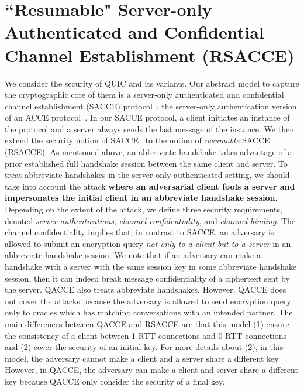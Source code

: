 \section{``Resumable" Server-only Authenticated and Confidential Channel Establishment (RSACCE)} \label{sec:rsacce}
We consider the security of QUIC and its variants.
Our abstract model to capture the cryptographic core
of them is a server-only authenticated and confidential
channel establishment (SACCE) protocol~\cite{KPW13:SACCE},
the server-only authentication version of an ACCE
protocol~\cite{JKSS12:ACCE}.
In our SACCE protocol, a client initiates an instance
of the protocol and a server always sends the last
message of the instance.
We then extend the security notion of
SACCE~\cite{KPW13:SACCE} to the notion of
\textit{resumable} SACCE (RSACCE).
As mentioned above, an abbreviate handshake takes
advantage of a prior established full handshake session
between the same client and server.
To treat abbreviate handshakes in the server-only
authenticated setting, we should take into account the
attack
\textbf{where an adversarial client fools a
server and impersonates the initial client in an
abbreviate handshake session.}
Depending on the extent of the attack, we define three
security requirements, denoted
\textit{server authentications},
\textit{channel confidentiality}, and \textit{channel binding}.
The channel confidentiality implies that, in contrast
to SACCE, an adversary is allowed to submit an
encryption query
\textit{not only to a client but to a server} in an
abbreviate handshake session.
We note that if an adversary can make a handshake with
a server with the same session key in some abbreviate
handshake session, then it can indeed break message
confidentiality of a ciphertext sent by the server.
QACCE also treats abbreviate handshakes.
However, QACCE does not cover the attacks because the
adversary is allowed to send encryption query only to
oracles which has matching conversations with an intended
partner.
The main differences between QACCE and RSACCE are that
this model (1) ensure the consistency of a client between
1-RTT connections and 0-RTT connections and (2) cover the
security of an initial key.
For more details about (2), in this model, the adversary
cannot make a client and a server share a different key.
However, in QACCE, the adversary can make a client and
server share a different key because QACCE only consider
the security of a final key.

